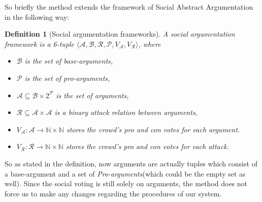 \documentclass{article}
\newtheorem{definition}{Definition}
\newcommand{\nat}{\mathbb{N}}   %
\newcommand{\args}{\mathcal{A}} %
\newcommand{\att}{\mathcal{R}}  %
\newcommand{\varg}{V_{\args}}   %
\newcommand{\vatt}{V_{\att}}   %
\begin{document}
{\color{red} 

So briefly the method extends the framework of Social Abstract Argumentation \cite{eml2013esaf} in the following way: %

\begin{definition}[Social argumentation frameworks]
A social argumentation framework is a 6-tuple $\langle \args, \mathcal{B}, \att, \mathcal{P}, \varg, \vatt \rangle$, where
\begin{itemize}
  \item $\mathcal{B}$ is the set of base-arguments,
  \item  $\mathcal{P}$ is the set of pro-arguments,
  \item $\args \subseteq \mathcal{B} \times 2^{\mathcal{P}}$  is the set of arguments,
  \item $\att \subseteq \args \times \args$ is a binary attack relation between arguments,
  \item $\varg : \args \to \nat \times \nat$ stores the crowd's pro and con votes for each argument.
  \item $\vatt : \att \to \nat \times \nat$ stores the crowd's pro and con votes for each attack.
\end{itemize}
\end{definition}

So as stated in the definition, now arguments are actually tuples which consist of a base-argument and a set of \textit{Pro-arguments}(which could be the empty set as well). Since the social voting  is still solely on arguments, the method does not force us to make any changes regarding the procedures of our system.

}
\end{document}
